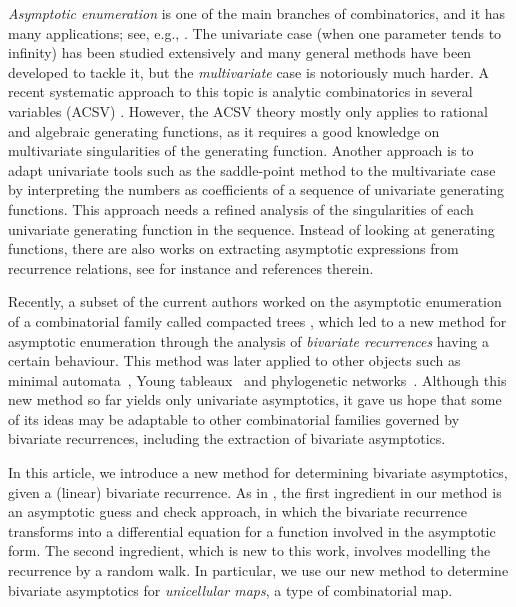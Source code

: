 \documentclass[a4paper,12pt]{article}
\theoremstyle{definition}
\begin{document}
\emph{Asymptotic enumeration} is one of the main branches of combinatorics, and it has many applications; see, e.g., \cite{flajolet}. The univariate case (when one parameter tends to infinity) has been studied extensively and many general methods have been developed to tackle it, but the \emph{multivariate} case is notoriously much harder. A recent systematic approach to this topic is analytic combinatorics in several variables (ACSV) \cite{acsv,acsv-mishna}. However, the ACSV theory mostly only applies to rational and algebraic generating functions, as it requires a good knowledge on multivariate singularities of the generating function. Another approach is to adapt univariate tools such as the saddle-point method \cite{flajolet} to the multivariate case by interpreting the numbers as coefficients of a sequence of univariate generating functions. This approach needs a refined analysis of the singularities of each univariate generating function in the sequence. Instead of looking at generating functions, there are also works on extracting asymptotic expressions from recurrence relations, see for instance \cite[Chapter~9]{rec-survey} and references therein. 

Recently, a subset of the current authors worked on the asymptotic enumeration of a combinatorial family called compacted trees \cite{compacted-tree}, which led to a new method for asymptotic enumeration through the analysis of \emph{bivariate recurrences} having a certain behaviour. This method was later applied to other objects such as minimal automata~\cite{minimal-automata}, Young tableaux~\cite{banderier2021walls} and phylogenetic networks~\cite{fuchs2021phylo}. Although this new method so far yields only univariate asymptotics, it gave us hope that some of its ideas may be adaptable to other combinatorial families governed by bivariate recurrences, including the extraction of bivariate asymptotics. %

In this article, we introduce a new method for determining bivariate asymptotics, given a (linear) bivariate recurrence. As in \cite{compacted-tree}, the first ingredient in our method is an asymptotic guess and check approach, in which the bivariate recurrence transforms into a differential equation for a function involved in the asymptotic form. The second ingredient, which is new to this work, involves modelling the recurrence by a random walk. In particular, we use our new method to determine bivariate asymptotics for \emph{unicellular maps}, a type of combinatorial map.
\end{document}
